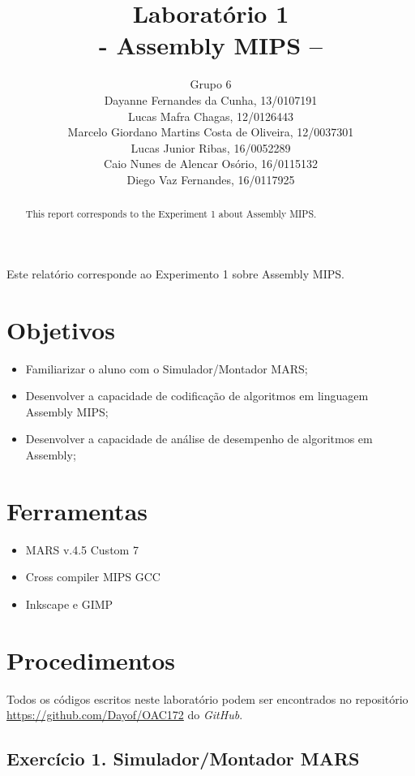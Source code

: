 \documentclass[12pt]{article}
\title{Laboratório 1\\- Assembly MIPS –}
\author{Grupo 6\\
	Dayanne Fernandes da Cunha, 13/0107191\\
	Lucas Mafra Chagas, 12/0126443\\
	Marcelo Giordano Martins Costa de Oliveira, 12/0037301\\
	Lucas Junior Ribas, 16/0052289\\
	Caio Nunes de Alencar Osório, 16/0115132\\
	Diego Vaz Fernandes, 16/0117925}
\begin{document}
\maketitle

 \begin{abstract}
	This report corresponds to the Experiment 1 about Assembly MIPS.
 \end{abstract}
 \begin{resumo}
	Este relatório corresponde ao Experimento 1 sobre Assembly MIPS.
 \end{resumo}

\section{Objetivos}
\label{sec:Objetivos}

\begin{itemize}
\item Familiarizar o aluno com o Simulador/Montador MARS;
\item Desenvolver a capacidade de codificação de algoritmos em linguagem Assembly MIPS;
\item Desenvolver a capacidade de análise de desempenho de algoritmos em Assembly;
\end{itemize}

\section{Ferramentas}
\label{sec:Materiais}

\begin{itemize}
\item MARS v.4.5 Custom 7
\item Cross compiler MIPS GCC
\item Inkscape e GIMP
\end{itemize}

\section{Procedimentos}
\label{sec:Procedimentos}

Todos os códigos escritos neste laboratório podem ser encontrados no repositório \url{https://github.com/Dayof/OAC172} do \textit{GitHub}.

\subsection{Exercício 1. Simulador/Montador MARS}
\label{subsec:mars}
\end{document}
